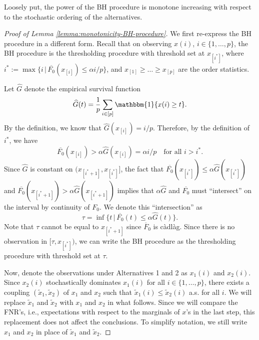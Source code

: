 Loosely put, the power of the BH procedure is monotone increasing with respect to the stochastic ordering of the alternatives.

\begin{proof}[Proof of Lemma \ref{lemma:monotonicity-BH-procedure}]
We first re-express the BH procedure in a different form.
Recall that on observing $x(i)$, $i\in\{1,\ldots,p\}$, the BH procedure is the thresholding procedure with threshold set at $x_{[i^*]}$, where $i^* := \max\{i\,|\,\overline{F_0}(x_{[i]})\le \alpha i/p\}$, and $x_{[1]}\ge\ldots\ge x_{[p]}$ are the order statistics.

Let $\widehat{G}$ denote the empirical survival function
\begin{equation} \label{eq:empirical-tail-distribution}
    \widehat{G}(t) = \frac{1}{p}\sum_{i\in[p]}\mathbbm{1}\{x(i) \ge t\}.
\end{equation}
By the definition, we know that $\widehat{G}(x_{[i]}) = i/p$.
Therefore, by the definition of $i^*$, we have
\begin{equation*} 
    \overline{F_0}(x_{[i]}) > \alpha\widehat{G}(x_{[i]}) = \alpha i/p \quad \text{for all }i>i^*.
\end{equation*}
Since $\widehat{G}$ is constant on $(x_{[i^*+1]}, x_{[i^*]}]$, the fact that 
$\overline{F_0}(x_{[i^*]}) \le \alpha\widehat{G}(x_{[i^*]})$ and $\overline{F_0}(x_{[i^*+1]}) > \alpha\widehat{G}(x_{[i^*+1]})$ implies that $\alpha\widehat{G}$ and $\overline{F_0}$ must ``intersect'' on the interval by continuity of $F_0$.
We denote this ``intersection'' as
\begin{equation} \label{eq:approx-boundary-proof-tau}
    \tau = \inf\{t\,|\,\overline{F_0}(t)\le\alpha\widehat{G}(t)\}. 
\end{equation}
Note that $\tau$ cannot be equal to $x_{[i^*+1]}$ since $\overline{F}_0$ is c\`adl\`ag.
Since there is no observation in $[\tau, x_{[i^*]})$, we can write the BH procedure as the thresholding procedure with threshold set at $\tau$.

Now, denote the observations under Alternatives 1 and 2 as $x_1(i)$ and $x_2(i)$.
Since $x_2(i)$ stochastically dominates $x_1(i)$ for all $i\in\{1,\ldots,p\}$, there exists a coupling $(\widetilde{x}_1, \widetilde{x}_2)$ of $x_1$ and $x_2$ such that 
$\widetilde{x}_1(i) \le \widetilde{x}_2(i)$ a.s. for all $i$.
We will replace $\widetilde{x}_1$ and $\widetilde{x}_2$ with $x_1$ and $x_2$ in what follows.
Since we will compare the FNR's, i.e., expectations with respect to the marginals of ${x}$'s in the last step, this replacement does not affect the conclusions.
To simplify notation, we still write $x_1$ and $x_2$ in place of $\widetilde{x}_1$ and $\widetilde{x}_2$.


\end{proof}
